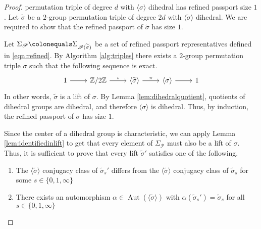 \documentclass{dcthesis}
\newcommand{\ZZ}{\mathbb Z}
\newcommand{\wt}[1]{\widetilde{#1}}
\DeclareMathOperator{\Aut}{Aut}
\numberwithin{equation}{section}
\theoremstyle{definition}
\theoremstyle{remark}
\begin{document}
{{{\begin{proof}
      permutation triple
      of degree $d$
      with $\langle\sigma\rangle$ dihedral
      has refined passport size $1$.
      Let $\wt{\sigma}$ be a $2$-group
      permutation triple of degree
      $2d$ with $\langle\wt{\sigma}\rangle$
      dihedral.
      We are required to show that the refined
      passport of $\wt{\sigma}$ has size $1$.
      \par
      Let $\Sigma_\mathscr{P}\colonequals
      \Sigma_{\mathscr{P}(\wt{\sigma})}$
      be a set of refined
      passport representatives defined in
      \eqref{eqn:refined}.
      By Algorithm \ref{alg:triples}
      there exists a $2$-group permutation triple
      $\sigma$ such that the
      following sequence is exact.
      \begin{equation}
        \label{eqn:sigmasequence}
        \begin{tikzcd}
          1\arrow{r}&\ZZ/2\ZZ\arrow{r}{\iota}
                    &\langle\wt{\sigma}\rangle\arrow{r}{\pi}
                    &\langle\sigma\rangle\arrow{r}
                    &1
        \end{tikzcd}
      \end{equation}
      In other words,
      $\wt{\sigma}$ is a lift of $\sigma$.
      By Lemma
      \ref{lem:dihedralquotient},
      quotients of dihedral groups are
      dihedral,
      and therefore
      $\langle\sigma\rangle$ is dihedral.
      Thus, by induction,
      the refined passport of $\sigma$
      has size $1$.
      \par
      Since the center of a dihedral group
      is characteristic, we can apply
      Lemma \ref{lem:identifiedinlift}
      to get that
      every element of $\Sigma_\mathscr{P}$
      must also be a lift of $\sigma$.
      Thus, it is sufficient to prove that every
      lift $\wt{\sigma}'$ satisfies one
      of the following.
      \begin{enumerate}
        \item\label{itm:distinctconjclasses}
          The $\langle\wt{\sigma}\rangle$
          conjugacy class of
          $\wt{\sigma}_s'$ differs from
          the $\langle\wt{\sigma}\rangle$
          conjugacy class of
          $\wt{\sigma}_s$ for
          some $s\in \{0,1,\infty\}$
        \item\label{itm:thereexistsanauto}
          There exists an automorphism
          $\alpha\in\Aut(\langle\wt{\sigma}\rangle)$
          with
          $\alpha(\wt{\sigma}_s') = \wt{\sigma}_s$
          for all $s\in \{0,1,\infty\}$
      \end{enumerate}

\end{proof}}}}
\end{document}
